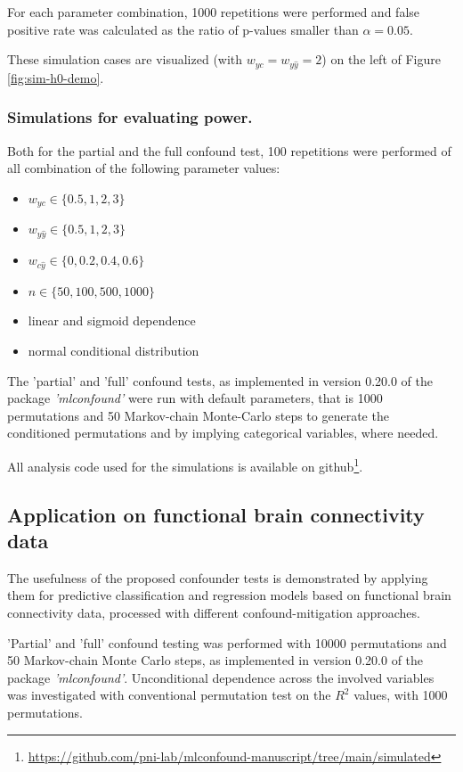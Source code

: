 \documentclass{article}
\begin{document}
For each parameter combination, 1000 repetitions were performed and false positive rate was calculated as the ratio of p-values smaller than $\alpha = 0.05$.

These simulation cases are visualized (with $w_{yc} = w_{y\hat{y}} = 2$) on the left of Figure \ref{fig:sim-h0-demo}.

\subsubsection*{Simulations for evaluating power.}

Both for the partial and the full confound test, 100 repetitions were performed of all combination of the following parameter values: 
\begin{itemize}
    \item $w_{yc} \in \{0.5, 1, 2, 3\}$
    \item $w_{y\hat{y}} \in \{0.5, 1, 2, 3\}$
    \item $w_{c\hat{y}} \in \{0, 0.2, 0.4, 0.6\}$
    \item $n \in \{50, 100, 500, 1000\}$
    \item linear and sigmoid dependence
    \item normal conditional distribution
\end{itemize}

The 'partial' and 'full' confound tests, as implemented in version 0.20.0 of the package \emph{'mlconfound'} were run with default parameters, that is 1000 permutations and 50 Markov-chain Monte-Carlo steps to generate the conditioned permutations and by implying categorical variables, where needed.

All analysis code used for the simulations is available on github\footnote{\href{https://github.com/pni-lab/mlconfound-manuscript/tree/main/simulated}{https://github.com/pni-lab/mlconfound-manuscript/tree/main/simulated}}.

\subsection{Application on functional brain connectivity data}

The usefulness of the proposed confounder tests is demonstrated by applying them for predictive classification and regression models based on functional brain connectivity data, processed with different confound-mitigation approaches. 

'Partial' and 'full' confound testing was performed with 10000 permutations and 50 Markov-chain Monte Carlo steps, as implemented in version 0.20.0 of the package \emph{'mlconfound'}. Unconditional dependence across the involved variables was investigated with conventional permutation test on the $R^2$ values, with 1000 permutations. 
\end{document}
